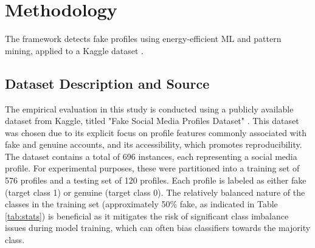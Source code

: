 \documentclass[conference]{IEEEtran}
\begin{document}
\section{Methodology}
\label{sec:method}
The framework detects fake profiles using energy-efficient ML and pattern mining, applied to a Kaggle dataset \cite{b5}.

\subsection{Dataset Description and Source}
The empirical evaluation in this study is conducted using a publicly available dataset from Kaggle, titled "Fake Social Media Profiles Dataset" \cite{b5}. This dataset was chosen due to its explicit focus on profile features commonly associated with fake and genuine accounts, and its accessibility, which promotes reproducibility. The dataset contains a total of 696 instances, each representing a social media profile. For experimental purposes, these were partitioned into a training set of 576 profiles and a testing set of 120 profiles. Each profile is labeled as either fake (target class 1) or genuine (target class 0). The relatively balanced nature of the classes in the training set (approximately 50\% fake, as indicated in Table \ref{tab:stats}) is beneficial as it mitigates the risk of significant class imbalance issues during model training, which can often bias classifiers towards the majority class.
\end{document}
